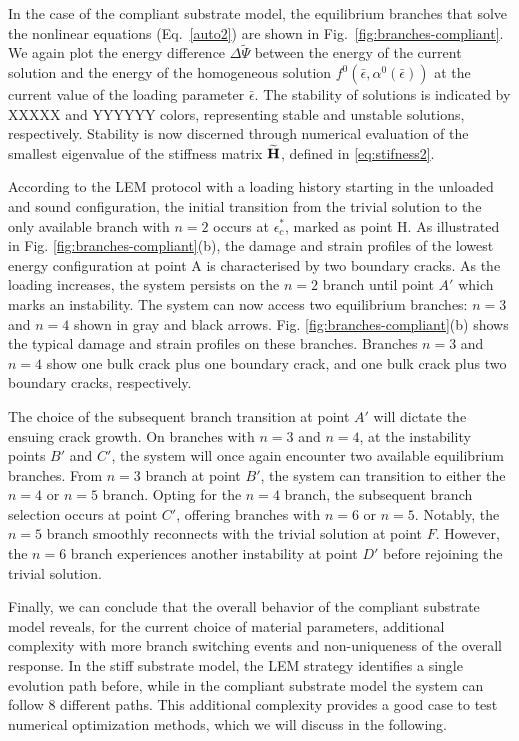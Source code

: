 In the case of the compliant substrate model, the equilibrium branches that solve the nonlinear equations (Eq.~\ref{auto2}) are shown in Fig.~\ref{fig:branches-compliant}. 
We again plot the energy difference $\Delta \widetilde\Psi$ between the energy of the current solution and the energy of the homogeneous solution $f^0(\bar{\epsilon}, \alpha^0(\bar{\epsilon}))$ at the current value of the loading parameter $\bar\epsilon$. 
The stability of solutions is indicated by XXXXX and YYYYYY colors, representing stable and unstable solutions, respectively. Stability is now discerned through numerical evaluation of the smallest eigenvalue of the stiffness matrix $\widetilde{\mathbf{H}}$, defined in \eqref{eq:stifness2}.

According to the LEM protocol with a loading history starting in the unloaded and sound configuration, the initial transition from the trivial solution to the only available branch with $n=2$ occurs at $\epsilon_c^*$, marked as point H. As illustrated in Fig. \ref{fig:branches-compliant}(b), the damage and strain profiles of the lowest energy configuration at point A is characterised by two boundary cracks. As the loading increases, the system persists on the $n=2$ branch until point $A'$ which marks an instability. The system can now access two equilibrium branches: $n=3$ and $n=4$ shown in gray and black arrows. Fig. \ref{fig:branches-compliant}(b) shows the typical damage and strain profiles on these branches. Branches $n=3$ and $n=4$ show one bulk crack plus one boundary crack, and one bulk crack plus two boundary cracks, respectively. 

The choice of the subsequent branch transition at point $A'$ will dictate the ensuing crack growth. On branches with $n=3$ and $n=4$, at the instability points $B'$ and $C'$, the system will once again encounter two available equilibrium branches. From $n=3$ branch  at point $B'$, the system can transition to either the $n=4$ or $n=5$ branch. Opting for the $n=4$ branch, the subsequent branch selection occurs at point $C'$, offering branches with $n=6$ or $n=5$. Notably, the $n=5$ branch smoothly reconnects with the trivial solution at point $F$. However, the $n=6$ branch experiences another instability at point $D'$ before rejoining the trivial solution. 

Finally, we can conclude that the overall behavior of the compliant substrate model reveals, for the current choice of material parameters, additional complexity with more branch switching events and non-uniqueness of the overall response. In the stiff substrate model, the LEM strategy identifies a single evolution path before, while in the compliant substrate model the system can follow 8 different paths. This additional complexity provides a good case to test numerical optimization methods, which we will discuss in the following.

